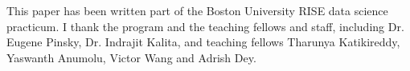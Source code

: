 \documentclass[12pt]{article}
\begin{document}
This paper has been written part of the Boston University RISE data science practicum. I thank the program and the teaching fellows and staff, including Dr. Eugene Pinsky, Dr. Indrajit Kalita, and teaching fellows Tharunya Katikireddy, Yaswanth Anumolu, Victor Wang and Adrish Dey.
\newpage
\thispagestyle{empty}
\singlespacing
\end{document}
